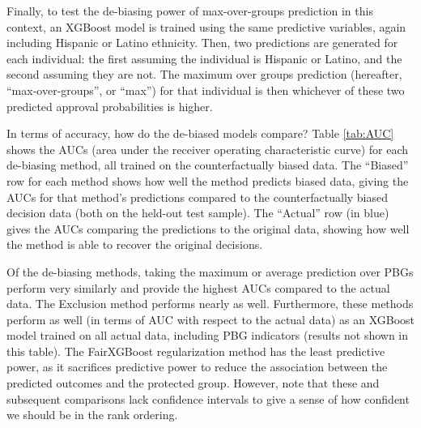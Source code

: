 Finally, to test the de-biasing power of max-over-groups prediction in this context, an XGBoost model is trained using the same predictive variables, again including Hispanic or Latino ethnicity. Then, two predictions are generated for each individual: the first assuming the individual is Hispanic or Latino, and the second assuming they are not. The maximum over groups prediction (hereafter, ``max-over-groups'', or ``max'') for that individual is then whichever of these two predicted approval probabilities is higher.

In terms of accuracy, how do the de-biased models compare? Table \ref{tab:AUC} shows the AUCs (area under the receiver operating characteristic curve) for each de-biasing method, all trained on the counterfactually biased data. The ``Biased'' row for each method shows how well the method predicts biased data, giving the AUCs for that method's predictions compared to the counterfactually biased decision data (both on the held-out test sample). The ``Actual'' row (in blue) gives the AUCs comparing the predictions to the original data, showing how well the method is able to recover the original decisions. 

Of the de-biasing methods, taking the maximum or average prediction over PBGs perform very similarly and provide the highest AUCs compared to the actual data. The Exclusion method performs nearly as well. Furthermore, these methods perform as well (in terms of AUC with respect to the actual data) as an XGBoost model trained on all actual data, including PBG indicators (results not shown in this table). The FairXGBoost regularization method has the least predictive power, as it sacrifices predictive power to reduce the association between the predicted outcomes and the protected group.  However, note that these and subsequent comparisons lack confidence intervals to give a sense of how confident we should be in the rank ordering.


